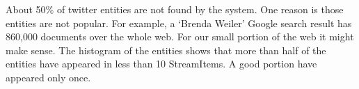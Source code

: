 About 50\% of twitter entities are not found by the system. One reason is those entities are not popular. For example, a `Brenda Weiler' Google search result has 860,000 documents over the whole web. For our small portion of the web it might make sense. The histogram of the entities shows that more than half of the entities have appeared in less than 10 StreamItems. A good portion have appeared only once.



